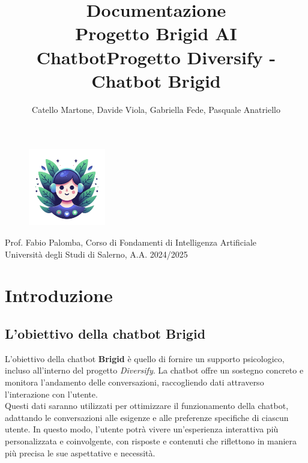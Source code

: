 \documentclass[12pt, letterpaper]{article}
\title{\Huge \textbf{Documentazione}\\[0.5cm]
\Large \textbf{Progetto Brigid AI Chatbot}}
\author{\large Catello Martone, Davide Viola, Gabriella Fede, Pasquale Anatriello}
\begin{document}
	
\begin{figure}[t]
\centering
\includegraphics[width=0.3\textwidth]{brigid.png}
\end{figure}
	
\maketitle
\vfill
\begin{center}
Prof. Fabio Palomba, Corso di Fondamenti di Intelligenza Artificiale\\
Università degli Studi di Salerno, A.A. 2024/2025
\end{center}
	
\newpage
\tableofcontents
\newpage
	

\title{Progetto Diversify - Chatbot Brigid}
\author{}
\date{}
	
\maketitle

\section{Introduzione}
	
\subsection{L'obiettivo della chatbot Brigid}
L'obiettivo della chatbot \textbf{Brigid} è quello di fornire un supporto psicologico, incluso all'interno del progetto \textit{Diversify}. La chatbot offre un sostegno concreto e monitora l'andamento delle conversazioni, raccogliendo dati attraverso l'interazione con l'utente.\\ 
Questi dati saranno utilizzati per ottimizzare il funzionamento della chatbot, adattando le conversazioni alle esigenze e alle preferenze specifiche di ciascun utente. In questo modo, l'utente potrà vivere un'esperienza interattiva più personalizzata e coinvolgente, con risposte e contenuti che riflettono in maniera più precisa le sue aspettative e necessità.
	
\end{document}
